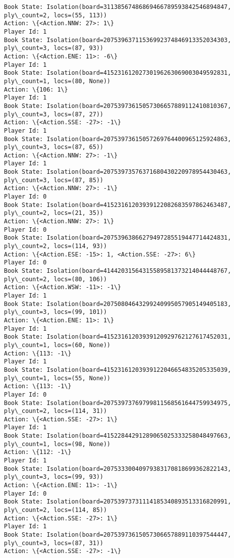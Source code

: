 \documentclass[11pt]{article}
\begin{document}
\begin{Verbatim}[commandchars=\\\{\}]
Book State: Isolation(board=31138567486869466789593842546894847, ply\_count=2, locs=(55, 113))
Action: \{<Action.NNW: 27>: 1\}
Player Id: 1
Book State: Isolation(board=20753963711536992374846913352034303, ply\_count=3, locs=(87, 93))
Action: \{<Action.ENE: 11>: -6\}
Player Id: 1
Book State: Isolation(board=41523161202730196263069003049592831, ply\_count=1, locs=(80, None))
Action: \{106: 1\}
Player Id: 1
Book State: Isolation(board=20753973615057306657889112410810367, ply\_count=3, locs=(87, 27))
Action: \{<Action.SSE: -27>: -1\}
Player Id: 1
Book State: Isolation(board=20753973615057269764400965125924863, ply\_count=3, locs=(87, 65))
Action: \{<Action.NNW: 27>: -1\}
Player Id: 1
Book State: Isolation(board=20753973576371680430220978954430463, ply\_count=3, locs=(87, 85))
Action: \{<Action.NNW: 27>: -1\}
Player Id: 0
Book State: Isolation(board=41523161203939122082683597862463487, ply\_count=2, locs=(21, 35))
Action: \{<Action.NNW: 27>: 1\}
Player Id: 0
Book State: Isolation(board=20753963866279497285519447714424831, ply\_count=2, locs=(114, 93))
Action: \{<Action.ESE: -15>: 1, <Action.SSE: -27>: 6\}
Player Id: 0
Book State: Isolation(board=41442031564315589581373214044448767, ply\_count=2, locs=(80, 106))
Action: \{<Action.WSW: -11>: -1\}
Player Id: 1
Book State: Isolation(board=20750804643299240995057905149405183, ply\_count=3, locs=(99, 101))
Action: \{<Action.ENE: 11>: 1\}
Player Id: 1
Book State: Isolation(board=41523161203939120929762127617452031, ply\_count=1, locs=(60, None))
Action: \{113: -1\}
Player Id: 1
Book State: Isolation(board=41523161203939122046654835205335039, ply\_count=1, locs=(55, None))
Action: \{113: -1\}
Player Id: 0
Book State: Isolation(board=20753973769799811568561644759934975, ply\_count=2, locs=(114, 31))
Action: \{<Action.SSE: -27>: 1\}
Player Id: 1
Book State: Isolation(board=41522844291289065025333258048497663, ply\_count=1, locs=(98, None))
Action: \{112: -1\}
Player Id: 1
Book State: Isolation(board=20753330040979383170818699362822143, ply\_count=3, locs=(99, 93))
Action: \{<Action.ENE: 11>: -1\}
Player Id: 0
Book State: Isolation(board=20753973731114185340893513316820991, ply\_count=2, locs=(114, 85))
Action: \{<Action.SSE: -27>: 1\}
Player Id: 1
Book State: Isolation(board=20753973615057306657889110397544447, ply\_count=3, locs=(87, 31))
Action: \{<Action.SSE: -27>: -1\}


\end{Verbatim}
\end{document}
